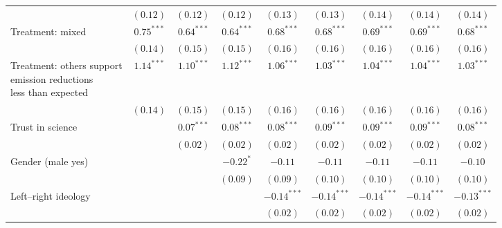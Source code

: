 \begin{table}[h]
\begin{center}
\begin{tabular}{l c c c c c c c c}
                                                                                & $(0.12)$      & $(0.12)$      & $(0.12)$      & $(0.13)$      & $(0.13)$      & $(0.14)$      & $(0.14)$      & $(0.14)$      \\
Treatment: mixed                                                                & $0.75^{***}$  & $0.64^{***}$  & $0.64^{***}$  & $0.68^{***}$  & $0.68^{***}$  & $0.69^{***}$  & $0.69^{***}$  & $0.68^{***}$  \\
                                                                                & $(0.14)$      & $(0.15)$      & $(0.15)$      & $(0.16)$      & $(0.16)$      & $(0.16)$      & $(0.16)$      & $(0.16)$      \\
\shortstack{Treatment: others support\\emission reductions\\less than expected} & $1.14^{***}$  & $1.10^{***}$  & $1.12^{***}$  & $1.06^{***}$  & $1.03^{***}$  & $1.04^{***}$  & $1.04^{***}$  & $1.03^{***}$  \\
                                                                                & $(0.14)$      & $(0.15)$      & $(0.15)$      & $(0.16)$      & $(0.16)$      & $(0.16)$      & $(0.16)$      & $(0.16)$      \\
Trust in science                                                                &               & $0.07^{***}$  & $0.08^{***}$  & $0.08^{***}$  & $0.09^{***}$  & $0.09^{***}$  & $0.09^{***}$  & $0.08^{***}$  \\
                                                                                &               & $(0.02)$      & $(0.02)$      & $(0.02)$      & $(0.02)$      & $(0.02)$      & $(0.02)$      & $(0.02)$      \\
Gender (male yes)                                                               &               &               & $-0.22^{*}$   & $-0.11$       & $-0.11$       & $-0.11$       & $-0.11$       & $-0.10$       \\
                                                                                &               &               & $(0.09)$      & $(0.09)$      & $(0.10)$      & $(0.10)$      & $(0.10)$      & $(0.10)$      \\
Left–right ideology                                                             &               &               &               & $-0.14^{***}$ & $-0.14^{***}$ & $-0.14^{***}$ & $-0.14^{***}$ & $-0.13^{***}$ \\
                                                                                &               &               &               & $(0.02)$      & $(0.02)$      & $(0.02)$      & $(0.02)$      & $(0.02)$      \\

\end{tabular}
\end{center}
\end{table}
